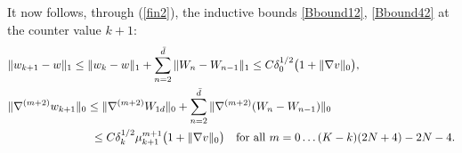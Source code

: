 \documentclass[reqno,twoside,11pt]{amsart}
\numberwithin{equation}{section}
\theoremstyle{plain}
\theoremstyle{definition}
\begin{document}
It now follows, through (\ref{fin2}), the inductive bounds
\ref{Bbound12}, \ref{Bbound42} at the counter value  $k+1$:
\begin{equation*}
\begin{split}
& \|w_{k+1}-w\|_1\leq \|w_k-w\|_1 + \sum_{n=2}^{\bar d} \|W_n-W_{n-1}\|_1\leq 
C \delta_0^{1/2}\big(1+\|\nabla v\|_0\big),
\\ & \|\nabla^{(m+2)}w_{k+1}\|_0\leq \|\nabla^{(m+2)}W_{1d}\|_0 + 
\sum_{n=2}^{\bar d} \|\nabla^{(m+2)}(W_n-W_{n-1})\|_0 \\ &
\hspace{2.56cm} \leq C\delta_k^{1/2}\mu_{k+1}^{m+1}\big(1+\|\nabla v\|_0\big)  
 \quad \mbox{for all } m =0\ldots (K-k)(2N+4)-2N-4.
\end{split}
\end{equation*}

\medskip
\end{document}
